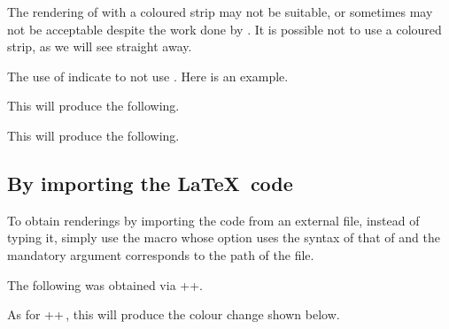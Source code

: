 The rendering of  with a coloured strip may not be suitable, or sometimes may not be acceptable despite the work done by .
It is possible not to use a coloured strip, as we will see straight away.


\begin{tdocexa}
    The use of  indicate to not use .
    Here is an example.



    This will produce the following.

    \medskip

    

\end{tdocexa}




\begin{tdocexa}
    \leavevmode



    This will produce the following.

    \medskip

    

\end{tdocexa}


\subsection{By importing the \LaTeX\ code}

To obtain renderings by importing the code from an external file, instead of typing it, simply use the  macro whose option uses the syntax of that of  and the mandatory argument corresponds to the path of the file.


\begin{tdocexa}
    The following was obtained via \tdocinlatex++.

    \medskip



    \medskip

    As for \tdocinlatex++\,, this will produce the colour change shown below.

    \medskip


\end{tdocexa}


